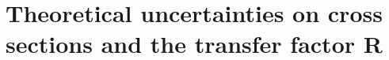 \documentclass[11pt,a4paper,openright,twoside]{report}
\begin{document}
%

\chapter{Theoretical uncertainties on cross sections and the transfer factor R}
\end{document}
